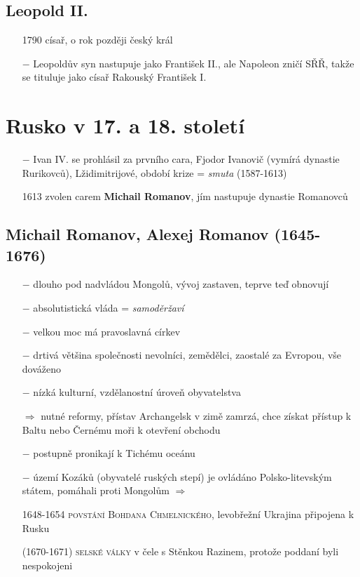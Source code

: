 \documentclass{article}
\begin{document}
\subsection*{Leopold II.}
\begin{itemize}
    \vspace{-0.5em}
    \setlength\itemsep{0.15em}
    \item[1790] císař, o rok později český král
    \item[$-$] Leopoldův syn nastupuje jako František II., ale Napoleon zničí SŘŘ, takže se tituluje jako císař Rakouský František I.
\end{itemize}


\section*{Rusko v 17. a 18. století}

\begin{itemize}
    \vspace{-0.5em}
    \setlength\itemsep{0.15em}
    \item[$-$] Ivan IV. se prohlásil za prvního cara, Fjodor Ivanovič (vymírá dynastie Rurikovců), Lžidimitrijové, období krize = \textit{smuta} (1587-1613)
    \item[1613] zvolen carem \textbf{Michail Romanov}, jím nastupuje dynastie Romanovců
\end{itemize}

\subsection*{Michail Romanov, Alexej Romanov (1645-1676)}
\begin{itemize}
    \vspace{-0.5em}
    \setlength\itemsep{0.15em}
    \item[$-$] dlouho pod nadvládou Mongolů, vývoj zastaven, teprve teď obnovují
    \item[$-$] absolutistická vláda = \textit{samoděržaví}
    \item[$-$] velkou moc má pravoslavná církev
    \item[$-$] drtivá většina společnosti nevolníci, zemědělci, zaostalé za Evropou, vše dováženo
    \item[$-$] nízká kulturní, vzdělanostní úroveň obyvatelstva
    \item[$\Rightarrow$] nutné reformy, přístav Archangelsk v zimě zamrzá, chce získat přístup k Baltu nebo Černému moři k otevření obchodu
    \item[$-$] postupně pronikají k Tichému oceánu
    \item[$-$] území Kozáků (obyvatelé ruských stepí) je ovládáno Polsko-litevským státem, pomáhali proti Mongolům $\Rightarrow$
    \item[1648-1654] \textsc{povstání Bohdana Chmelnického}, levobřežní Ukrajina připojena k Rusku
    \item[(1670-1671)] \textsc{selské války} v čele s Stěnkou Razinem, protože poddaní byli nespokojeni
\end{itemize}
\end{document}
